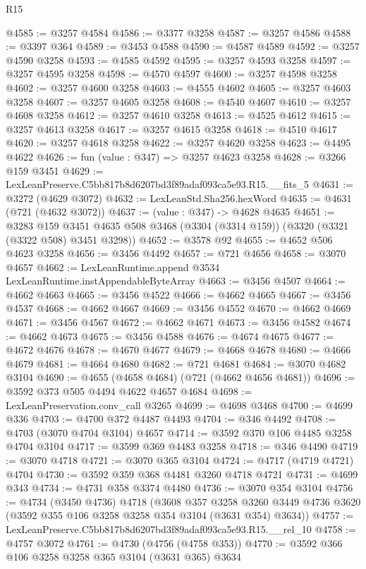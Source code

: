 \begin{lexlean}{R15}
\begin{coremodule}
@4585 := @3257 @4584
@4586 := @3377 @3258
@4587 := @3257 @4586
@4588 := @3397 @364
@4589 := @3453 @4588
@4590 := @4587 @4589
@4592 := @3257 @4590 @3258
@4593 := @4585 @4592
@4595 := @3257 @4593 @3258
@4597 := @3257 @4595 @3258
@4598 := @4570 @4597
@4600 := @3257 @4598 @3258
@4602 := @3257 @4600 @3258
@4603 := @4555 @4602
@4605 := @3257 @4603 @3258
@4607 := @3257 @4605 @3258
@4608 := @4540 @4607
@4610 := @3257 @4608 @3258
@4612 := @3257 @4610 @3258
@4613 := @4525 @4612
@4615 := @3257 @4613 @3258
@4617 := @3257 @4615 @3258
@4618 := @4510 @4617
@4620 := @3257 @4618 @3258
@4622 := @3257 @4620 @3258
@4623 := @4495 @4622
@4626 := fun (value : @347) => @3257 @4623 @3258
@4628 := @3266 @159 @3451
@4629 := LexLeanPreserve.C5bb817b8d6207bd3f89adaf093ca5e93.R15.__fits_5
@4631 := @3272 (@4629 @3072)
@4632 := LexLeanStd.Sha256.hexWord
@4635 := @4631 (@721 (@4632 @3072))
@4637 := (value : @347) -> @4628 @4635
@4651 := @3283
    @159
    @3451
    @4635
    @508
    @3468
    (@3304 (@3314 @159))
    (@3320 (@3321 (@3322 @508) @3451 @3298))
@4652 := @3578 @92
@4655 := @4652 @506 @4623 @3258
@4656 := @3456 @4492
@4657 := @721 @4656
@4658 := @3070 @4657
@4662 := LexLeanRuntime.append @3534 LexLeanRuntime.instAppendableByteArray
@4663 := @3456 @4507
@4664 := @4662 @4663
@4665 := @3456 @4522
@4666 := @4662 @4665
@4667 := @3456 @4537
@4668 := @4662 @4667
@4669 := @3456 @4552
@4670 := @4662 @4669
@4671 := @3456 @4567
@4672 := @4662 @4671
@4673 := @3456 @4582
@4674 := @4662 @4673
@4675 := @3456 @4588
@4676 := @4674 @4675
@4677 := @4672 @4676
@4678 := @4670 @4677
@4679 := @4668 @4678
@4680 := @4666 @4679
@4681 := @4664 @4680
@4682 := @721 @4681
@4684 := @3070 @4682 @3104
@4690 := @4655 (@4658 @4684) (@721 (@4662 @4656 @4681))
@4696 := @3592 @373 @505 @4494 @4622 @4657 @4684
@4698 := LexLeanPreservation.conv_call @3265
@4699 := @4698 @3468
@4700 := @4699 @336
@4703 := @4700 @372 @4487 @4493
@4704 := @346 @4492
@4708 := @4703 (@3070 @4704 @3104) @4657
@4714 := @3592 @370 @106 @4485 @3258 @4704 @3104
@4717 := @3599 @369 @4483 @3258
@4718 := @346 @4490
@4719 := @3070 @4718
@4721 := @3070 @365 @3104
@4724 := @4717 (@4719 @4721) @4704
@4730 := @3592 @359 @368 @4481 @3260 @4718 @4721
@4731 := @4699 @343
@4734 := @4731 @358 @3374 @4480
@4736 := @3070 @354 @3104
@4756 := @4734
    (@3450 @4736)
    @4718
    (@3608
      @357
      @3258
      @3260
      @3449
      @4736
      @3620
      (@3592 @355 @106 @3258 @3258 @354 @3104 (@3631 @354) @3634))
@4757 := LexLeanPreserve.C5bb817b8d6207bd3f89adaf093ca5e93.R15.__rel_10
@4758 := @4757 @3072
@4761 := @4730 (@4756 (@4758 @353))
@4770 := @3592 @366 @106 @3258 @3258 @365 @3104 (@3631 @365) @3634

\end{coremodule}
\end{lexlean}
